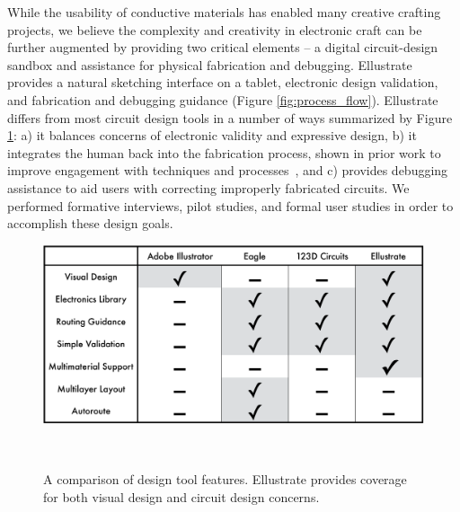 \documentclass{sigchi}
\begin{document}
While the usability of conductive materials has enabled many creative crafting projects, we believe the complexity and creativity in electronic craft can be further augmented by providing two critical elements -- a digital circuit-design sandbox and assistance for physical fabrication and debugging. Ellustrate provides a natural sketching interface on a tablet, electronic design validation, and fabrication and debugging guidance (Figure \ref{fig:process_flow}). 
Ellustrate differs from most circuit design tools in a number of ways summarized by Figure \ref{fig:comparison_table}: a) it balances concerns of electronic validity and expressive design, b) it integrates the human back into the fabrication process, shown in prior work to improve engagement with techniques and processes~\cite{anonmyzied_proxy}, and c) provides debugging assistance to aid users with correcting improperly fabricated circuits. We performed formative interviews, pilot studies, and formal user studies in order to accomplish these design goals. 


\begin{figure}[b]
\centering
  \includegraphics[width=1\columnwidth]{figures/comparative_table.pdf}
  \caption{A comparison of design tool features. Ellustrate provides coverage for both visual design and circuit design concerns. }~\label{fig:comparison_table}
  \vspace{-16pt}
\end{figure}

\end{document}
